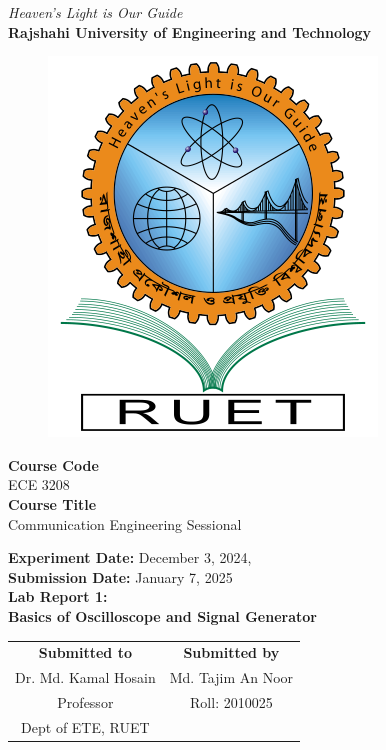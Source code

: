 \vspace*{\fill}
\begin{center}

    \emph{Heaven's Light is Our Guide} \\
    \textbf{Rajshahi University of Engineering and Technology} \\

    \begin{figure}[H]
        \centering
        \includegraphics[scale=.34]{images/RUET_logo.png}
        \label{fig:ruet_logo}
    \end{figure}
    \vspace{5mm}

    \textbf{Course Code}\\
    ECE 3208\\
    \vspace{3mm}
    \textbf{Course Title}\\
    Communication Engineering Sessional

    \vspace{5mm}
    \textbf{Experiment Date:} {December 3, 2024},\\
    \textbf{Submission Date:} {January 7, 2025}\\

    \vspace{5mm}
    \textbf{Lab Report 1: \\
        Basics of Oscilloscope and Signal Generator}

    \vspace{15mm}

    \begin{tabular}{c|c}
        \textbf{Submitted to} & \textbf{Submitted by} \\
        Dr. Md. Kamal Hosain     & Md. Tajim An Noor     \\
        Professor              & Roll: 2010025         \\
        Dept of ETE, RUET     &                       \\
    \end{tabular}

\end{center}
\vspace*{\fill}
